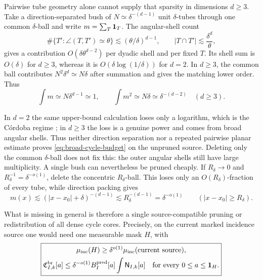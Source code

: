 \documentclass[11pt]{article}
\begin{document}
Pairwise tube geometry alone cannot supply that sparsity in dimensions
\(d\ge3\).  Take a direction-separated bush of
\(N\simeq\delta^{-(d-1)}\) unit \(\delta\)-tubes through one common
\(\delta\)-ball and write \(m=\sum_T{\bf1}_T\).  The angular-shell count
\[
 \#\{T':\angle(T,T')\simeq\theta\}
 \lesssim(\theta/\delta)^{d-1},
 \qquad
 |T\cap T'|\lesssim\frac{\delta^d}{\theta},
\]
gives a contribution \(O(\delta\theta^{d-2})\) per dyadic shell and per
fixed \(T\).  Its shell sum is \(O(\delta)\) for \(d\ge3\), whereas it is
\(O(\delta\log(1/\delta))\) for \(d=2\).  In \(d\ge3\), the common ball
contributes \(N^2\delta^d\simeq N\delta\) after summation and gives the
matching lower order.  Thus
\begin{equation}\label{eq:bush-pairwise-power-loss}
 \boxed{
 \int m\simeq N\delta^{d-1}\simeq1,
 \qquad
 \int m^2\simeq N\delta\simeq\delta^{-(d-2)}
 \quad(d\ge3).}
\end{equation}

In \(d=2\) the same upper-bound calculation loses only a logarithm, which is
the C\'ordoba regime \cite{Cordoba77};
in \(d\ge3\) the loss is a genuine power and comes from broad angular shells.
Thus neither direction separation nor a repeated pairwise planar estimate
proves \eqref{eq:broad-cycle-budget} on the unpruned source.  Deleting only the
common \(\delta\)-ball does not fix this: the outer angular shells still have
large multiplicity.  A single bush can nevertheless be pruned cheaply.  If
\(R_\delta\to0\) and \(R_\delta^{-1}=\delta^{-o(1)}\), delete the concentric
\(R_\delta\)-ball.  This loses only an \(O(R_\delta)\)-fraction of every tube,
while direction packing gives
\[
 m(x)\lesssim (|x-x_0|+\delta)^{-(d-1)}
 \lesssim R_\delta^{-(d-1)}=\delta^{-o(1)}
 \qquad (|x-x_0|\ge R_\delta).
\]

What is missing in general is therefore a single source-compatible pruning or
redistribution of all dense cycle cores.  Precisely, on the current marked
incidence source one would need one measurable mask \(H\), with
\begin{equation}\label{eq:global-cycle-pruning-target}
 \boxed{\begin{gathered}
 \mu_{\rm inc}(H)
 \ge\delta^{o(1)}\mu_{\rm inc}(\text{current source}),\\
 \mathfrak C_{I,k}^{\rm br}[a]
 \le\delta^{-o(1)}B_I^{\rm pred}[a]
       \int\mathsf N_{I,k}[a]
 \quad\text{for every }0\le a\le{\bf1}_H.
 \end{gathered}}
\end{equation}
\end{document}
